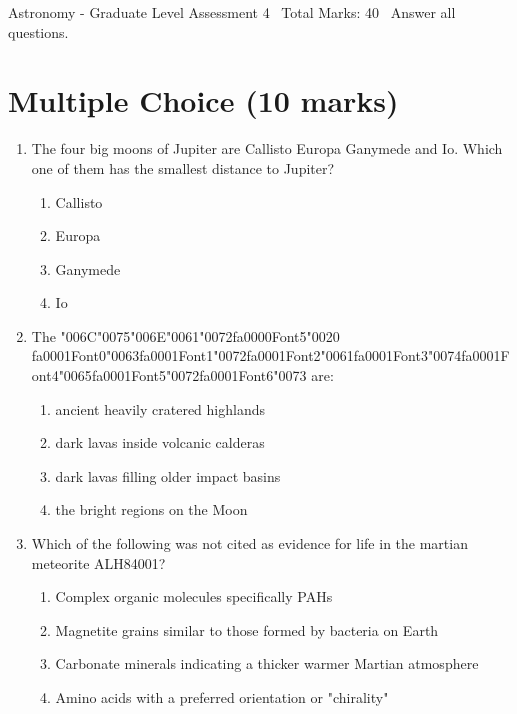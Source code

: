 \documentclass[12pt]{article}
\begin{document}
\begin{center}
Astronomy - Graduate Level Assessment 4 \
Total Marks: 40 \
Answer all questions.
\end{center}

\section*{Multiple Choice (10 marks)}
\begin{enumerate}[label=\arabic*.]
\item The four big moons of Jupiter are Callisto Europa Ganymede and Io. Which one of them has
the smallest distance to Jupiter?
\begin{enumerate}[label=(\alph*)]
    \item Callisto
    \item Europa
    \item Ganymede
    \item Io
\end{enumerate}
\item The {\char"006C}{\char"0075}{\char"006E}{\char"0061}{\char"0072}{\csname fa0000Font5\endcsname\char"0020} {\csname fa0001Font0\endcsname\char"0063}{\csname fa0001Font1\endcsname\char"0072}{\csname fa0001Font2\endcsname\char"0061}{\csname fa0001Font3\endcsname\char"0074}{\csname fa0001Font4\endcsname\char"0065}{\csname fa0001Font5\endcsname\char"0072}{\csname fa0001Font6\endcsname\char"0073} are:
\begin{enumerate}[label=(\alph*)]
    \item ancient heavily cratered highlands
    \item dark lavas inside volcanic calderas
    \item dark lavas filling older impact basins
    \item the bright regions on the Moon
\end{enumerate}
\item Which of the following was not cited as evidence for life in the martian meteorite
ALH84001?
\begin{enumerate}[label=(\alph*)]
    \item Complex organic molecules specifically PAHs
    \item Magnetite grains similar to those formed by bacteria on Earth
    \item Carbonate minerals indicating a thicker warmer Martian atmosphere
    \item Amino acids with a preferred orientation or "chirality"
\end{enumerate}

\end{enumerate}
\end{document}
